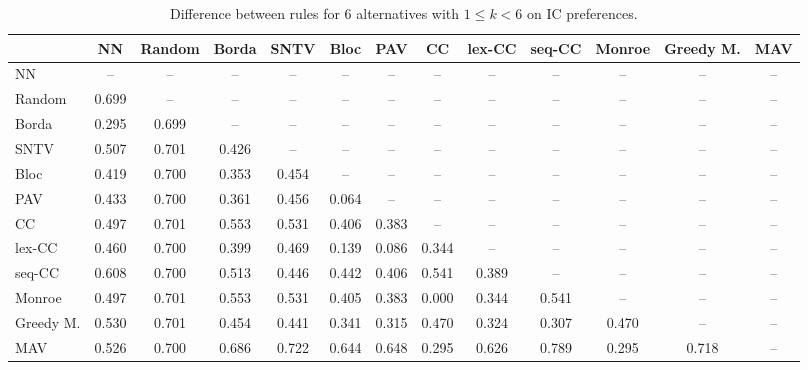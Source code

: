 
\begin{table*}[h!]
\centering
\begin{tabular}{lcccccccccccc}
\toprule
 & NN & Random & Borda & SNTV & Bloc & PAV & CC & lex-CC & seq-CC & Monroe & Greedy M. & MAV \\
\midrule
NN & -- & -- & -- & -- & -- & -- & -- & -- & -- & -- & -- & -- \\
Random & 0.699 & -- & -- & -- & -- & -- & -- & -- & -- & -- & -- & -- \\
Borda & 0.295 & 0.699 & -- & -- & -- & -- & -- & -- & -- & -- & -- & -- \\
SNTV & 0.507 & 0.701 & 0.426 & -- & -- & -- & -- & -- & -- & -- & -- & -- \\
Bloc & 0.419 & 0.700 & 0.353 & 0.454 & -- & -- & -- & -- & -- & -- & -- & -- \\
PAV & 0.433 & 0.700 & 0.361 & 0.456 & 0.064 & -- & -- & -- & -- & -- & -- & -- \\
CC & 0.497 & 0.701 & 0.553 & 0.531 & 0.406 & 0.383 & -- & -- & -- & -- & -- & -- \\
lex-CC & 0.460 & 0.700 & 0.399 & 0.469 & 0.139 & 0.086 & 0.344 & -- & -- & -- & -- & -- \\
seq-CC & 0.608 & 0.700 & 0.513 & 0.446 & 0.442 & 0.406 & 0.541 & 0.389 & -- & -- & -- & -- \\
Monroe & 0.497 & 0.701 & 0.553 & 0.531 & 0.405 & 0.383 & 0.000 & 0.344 & 0.541 & -- & -- & -- \\
Greedy M. & 0.530 & 0.701 & 0.454 & 0.441 & 0.341 & 0.315 & 0.470 & 0.324 & 0.307 & 0.470 & -- & -- \\
MAV & 0.526 & 0.700 & 0.686 & 0.722 & 0.644 & 0.648 & 0.295 & 0.626 & 0.789 & 0.295 & 0.718 & -- \\
\bottomrule
\end{tabular}

\caption{Difference between rules for 6 alternatives with $1 \leq k < 6$ on IC preferences.}
\end{table*}
